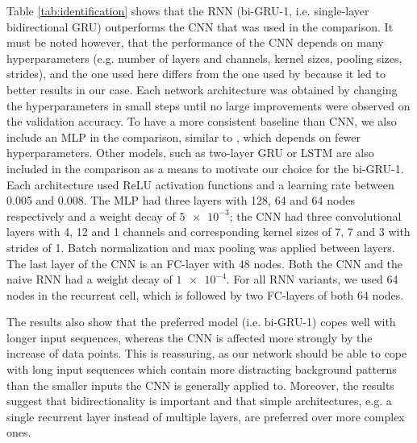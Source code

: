 Table \ref{tab:identification} shows that the RNN (bi-GRU-1, i.e. single-layer bidirectional GRU) outperforms the CNN that was used in the comparison. It must be noted however, that the performance of the CNN depends on many hyperparameters (e.g. number of layers and channels, kernel sizes, pooling sizes, strides), and the one used here differs from the one used by \cite{pearson2018searching} because it led to better results in our case. Each network architecture was obtained by changing the hyperparameters in small steps until no large improvements were observed on the validation accuracy. To have a more consistent baseline than CNN, we also include an MLP in the comparison, similar to \cite{pearson2018searching}, which depends on fewer hyperparameters. Other models, such as two-layer GRU or LSTM are also included in the comparison as a means to motivate our choice for the bi-GRU-1. Each architecture used ReLU activation functions and a learning rate between 0.005 and 0.008. The MLP had three layers with 128, 64 and 64 nodes respectively and a weight decay of $\num{5e-3}$; the CNN had three convolutional layers with 4, 12 and 1 channels and corresponding kernel sizes of 7, 7 and 3 with strides of 1. Batch normalization and max pooling was applied between layers. The last layer of the CNN is an FC-layer with 48 nodes. Both the CNN and the naive RNN had a weight decay of $\num{1e-4}$. For all RNN variants, we used 64 nodes in the recurrent cell, which is followed by two FC-layers of both 64 nodes. 

The results also show that the preferred model (i.e. bi-GRU-1) copes well with longer input sequences, whereas the CNN is affected more strongly by the increase of data points. This is reassuring, as our network should be able to cope with long input sequences which contain more distracting background patterns than the smaller inputs the CNN is generally applied to. Moreover, the results suggest that bidirectionality is important and that simple architectures, e.g. a single recurrent layer instead of multiple layers, are preferred over more complex ones.

